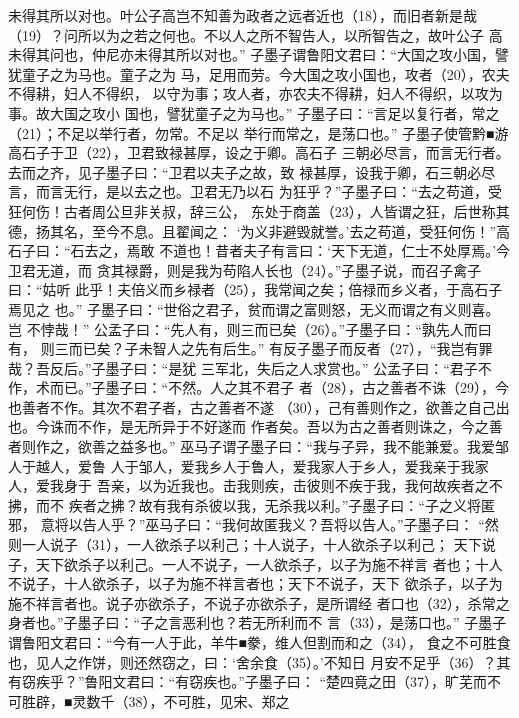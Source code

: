 \documentclass[12pt,UTF8]{ctexbook}
\begin{document}
未得其所以对也。叶公子高岂不知善为政者之远者近也（18），而旧者新是哉 
（19）？问所以为之若之何也。不以人之所不智告人，以所智告之，故叶公子 
高未得其问也，仲尼亦未得其所以对也。” 
子墨子谓鲁阳文君曰：“大国之攻小国，譬犹童子之为马也。童子之为 
马，足用而劳。今大国之攻小国也，攻者（20），农夫不得耕，妇人不得织， 
以守为事；攻人者，亦农夫不得耕，妇人不得织，以攻为事。故大国之攻小 
国也，譬犹童子之为马也。” 
子墨子曰：“言足以复行者，常之（21）；不足以举行者，勿常。不足以 
举行而常之，是荡口也。” 
子墨子使管黔■游高石子于卫（22），卫君致禄甚厚，设之于卿。高石子 
三朝必尽言，而言无行者。去而之齐，见子墨子曰：“卫君以夫子之故，致 
禄甚厚，设我于卿，石三朝必尽言，而言无行，是以去之也。卫君无乃以石 
为狂乎？”子墨子曰：“去之苟道，受狂何伤！古者周公旦非关叔，辞三公， 
东处于商盖（23），人皆谓之狂，后世称其德，扬其名，至今不息。且翟闻之： 
‘为义非避毁就誉。’去之苟道，受狂何伤！”高石子曰：“石去之，焉敢 
不道也！昔者夫子有言曰：‘天下无道，仁士不处厚焉。’今卫君无道，而 
贪其禄爵，则是我为苟陷人长也（24）。”子墨子说，而召子禽子曰：“姑听 
此乎！夫倍义而乡禄者（25），我常闻之矣；倍禄而乡义者，于高石子焉见之 
也。” 
子墨子曰：“世俗之君子，贫而谓之富则怒，无义而谓之有义则喜。岂 
不悖哉！” 
公孟子曰：“先人有，则三而已矣（26）。”子墨子曰：“孰先人而曰有， 
则三而已矣？子未智人之先有后生。” 
有反子墨子而反者（27），“我岂有罪哉？吾反后。”子墨子曰：“是犹 
三军北，失后之人求赏也。” 
公孟子曰：“君子不作，术而已。”子墨子曰：“不然。人之其不君子 
者（28），古之善者不诛（29），今也善者不作。其次不君子者，古之善者不遂 
（30），己有善则作之，欲善之自己出也。今诛而不作，是无所异于不好遂而 
作者矣。吾以为古之善者则诛之，今之善者则作之，欲善之益多也。” 
巫马子谓子墨子曰：“我与子异，我不能兼爱。我爱邹人于越人，爱鲁 
人于邹人，爱我乡人于鲁人，爱我家人于乡人，爱我亲于我家人，爱我身于 
吾亲，以为近我也。击我则疾，击彼则不疾于我，我何故疾者之不拂，而不 
疾者之拂？故有我有杀彼以我，无杀我以利。”子墨子曰：“子之义将匿邪， 
意将以告人乎？”巫马子曰：“我何故匿我义？吾将以告人。”子墨子曰： 
“然则一人说子（31），一人欲杀子以利己；十人说子，十人欲杀子以利己； 
天下说子，天下欲杀子以利己。一人不说子，一人欲杀子，以子为施不祥言 
者也；十人不说子，十人欲杀子，以子为施不祥言者也；天下不说子，天下 
欲杀子，以子为施不祥言者也。说子亦欲杀子，不说子亦欲杀子，是所谓经 
者口也（32），杀常之身者也。”子墨子曰：“子之言恶利也？若无所利而不 
言（33），是荡口也。” 
子墨子谓鲁阳文君曰：“今有一人于此，羊牛■豢，维人但割而和之（34）， 
食之不可胜食也，见人之作饼，则还然窃之，曰：‘舍余食（35）。’不知日 
月安不足乎（36）？其有窃疾乎？”鲁阳文君曰：“有窃疾也。”子墨子曰： 
“楚四竟之田（37），旷芜而不可胜辟，■灵数千（38），不可胜，见宋、郑之 
\end{document}
